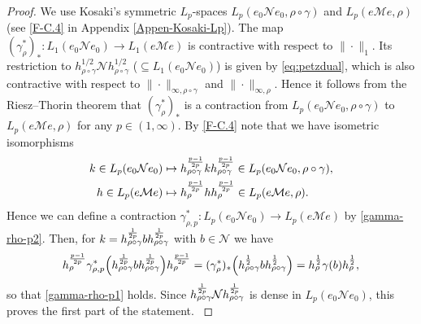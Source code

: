\documentclass[12pt]{article}
\theoremstyle{definition}
\theoremstyle{remark}
\numberwithin{equation}{section}
\def\Me{\mathcal M}
\def\Ne{\mathcal N}
\begin{document}
\begin{proof}
{
We use Kosaki's symmetric $L_p$-spaces $L_p(e_0\Ne e_0,\rho\circ\gamma)$ and
$L_p(e\Me e,\rho)$ (see \eqref{F-C.4} in Appendix \ref{Appen-Kosaki-Lp}). The map
$(\gamma_\rho^*)_*:L_1(e_0\Ne e_0)\to L_1(e\Me e)$ is contractive
with respect to $\|\cdot\|_1$. Its restriction to $h_{\rho\circ\gamma}^{1/2}\Ne h_{\rho\circ\gamma}^{1/2}$
($\subseteq L_1(e_0\Ne e_0)$) is given by \eqref{eq:petzdual}, which is also contractive with respect
to $\|\cdot\|_{\infty,\rho\circ\gamma}$ and $\|\cdot\|_{\infty,\rho}$. Hence it follows from the Riesz--Thorin
theorem that $(\gamma_\rho^*)_*$ is a contraction from $L_p(e_0\Ne e_0,\rho\circ\gamma)$ to
$L_p(e\Me e,\rho)$ for any $p\in(1,\infty)$. By \eqref{F-C.4} note that we have isometric isomorphisms
\begin{align*}
k\in L_p(e_0\Ne e_0)&\mapsto h_{\rho\circ\gamma}^{p-1\over2p}kh_{\rho\circ\gamma}^{p-1\over2p}
\in L_p(e_0\Ne e_0,\rho\circ\gamma), \\
h\in L_p(e\Me e)&\mapsto h_\rho^{p-1\over2p}hh_\rho^{p-1\over2p}\in L_p(e\Me e,\rho).
\end{align*}
Hence we can define a contraction $\gamma_{\rho,p}^*:L_p(e_0\Ne e_0)\to L_p(e\Me e)$ by
\eqref{gamma-rho-p2}. Then, for $k=h_{\rho\circ\gamma}^{1\over2p}bh_{\rho\circ\gamma}^{1\over2p}$
with $b\in\Ne$ we have
\[
h_\rho^{p-1\over2p}\gamma_{\rho,p}^*\Bigl(h_{\rho\circ\gamma}^{1\over2p}b
h_{\rho\circ\gamma}^{1\over2p}\Bigr)h_\rho^{p-1\over2p}
=(\gamma_\rho^*)_*\Bigl(h_{\rho\circ\gamma}^{1\over2}bh_{\rho\circ\gamma}^{1\over2}\Bigr)
=h_\rho^{1\over2}\gamma(b)h_\rho^{1\over2},
\]
so that \eqref{gamma-rho-p1} holds.
Since $h_{\rho\circ\gamma}^{1\over 2p}\Ne h^{1\over
2p}_{\rho\circ\gamma}$ is dense in $L_p(e_0 \Ne e_0)$, this proves the first part of the statement.
}


\end{proof}
\end{document}
